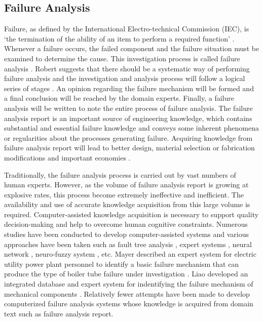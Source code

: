 \documentclass{elsarticle}
\begin{document}
\subsection{Failure Analysis
}
\label{sec:failure-analysis-}

Failure, as defined by the International Electro-technical Commission
(IEC), is ‘the termination of the ability of an item to perform a
required function’ \cite{failureiec}. Whenever a failure occurs, the
failed component and the failure situation must be examined to
determine the cause. This investigation process is called failure
analysis \cite{Liao1999}. Robert suggests that there should be a
systematic way of performing failure analysis and the investigation
and analysis process will follow a logical series of stages
\cite{roberts1980stm}. An opinion regarding the failure mechanism will
be formed and a final conclusion will be reached by the domain
experts. Finally, a failure analysis will be written to note the
entire process of failure analysis. The failure analysis report is an
important source of engineering knowledge, which contains substantial
and essential failure knowledge and conveys some inherent phenomena or
regularities about the processes generating failure. Acquiring
knowledge from failure analysis report will lead to better design,
material selection or fabrication modifications and important
economies \cite{Castro2004}. 

Traditionally, the failure analysis process is carried out by vast
numbers of human experts. However, as the volume of failure analysis
report is growing at explosive rates, this process become extremely
ineffective and inefficient. The availability and use of accurate
knowledge acquisition from this large volume is
required. Computer-assisted knowledge acquisition is necessary to
support quality decision-making and help to overcome human cognitive
constraints.  Numerous studies have been conducted to develop
computer-assisted systems and various approaches have been taken such
as fault tree analysis \cite{Israel2006}, expert systems \cite{Kim2004}, neural
network \cite{Zakarian1999}, neuro-fuzzy system \cite{Chen2006}, etc. Mayer described an expert system for electric utility power plant personnel to identify a basic failure mechanism that can produce the type of boiler tube failure under investigation \cite{Mayer1990}. Liao developed an integrated database and expert system for indentifying the failure mechanism of mechanical components \cite{liao1999ida}. Relatively fewer attempts have been made to develop computerized failure analysis systems whose knowledge is acquired from domain text such as failure analysis report.
\end{document}
